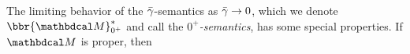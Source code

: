 The limiting behavior of the ${\bar\gamma}$-semantics as ${\bar\gamma} \to 0$,
% 
which we denote $\bbr{\dg M}^*_{0^+}$ and call the \emph{$0^+$\!-semantics},
has some special properties.
%
If $\dg M$ is proper, then        
